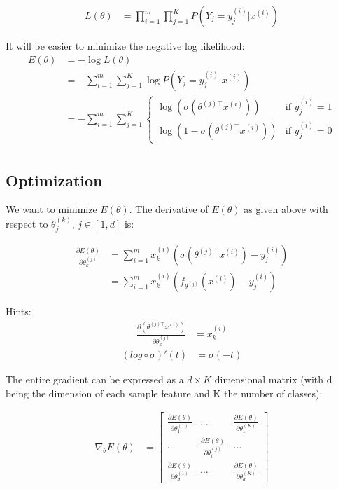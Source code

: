 \begin{align}
	L(\theta) &= \prod_{i=1}^m \prod_{j=1}^K P(Y_j=y_j^{(i)} | x^{(i)}) 
\end{align}


It will be easier to minimize the negative log likelihood:
\begin{align}
	E(\theta) &=  - \log L(\theta) \\
			  &= - \sum_{i=1}^m \sum_{j=1}^K \log  P(Y_j=y_j^{(i)} | x^{(i)}) \\
  			  &= -  \sum_{i=1}^m \sum_{j=1}^K
  			  	\left\{
				    \begin{array}{ll}
				        \log (\sigma(\theta^{(j)\top} x^{(i)})) & \mbox{if } y_j^{(i)} =1 \\
				        \log (1 - \sigma(\theta^{(j)\top} x^{(i)})) & \mbox{if } y_j^{(i)} =0 
				    \end{array}
				\right. \\
\end{align}


\subsection*{Optimization}

We want to minimize $E(\theta)$. The derivative of $E(\theta)$ as given above with respect to $\theta_j^{(k)}$, $j \in [1,d]$ is:

\begin{align}
	\frac{\partial E(\theta)}{\partial \theta_k^{(j)}} 
	&= \sum_{i=1}^m x^{(i)}_k (\sigma(\theta^{(j)\top} x^{(i)}) - y_j^{(i)}) \\
	&= \sum_{i=1}^m x^{(i)}_k (f_{\theta^{(j)}}(x^{(i)})  - y_j^{(i)}) 
\end{align}

Hints:
\begin{align}
	\frac{\partial (\theta^{(j)\top} x^{(i)}) }{\partial \theta_k^{(j)}}  &= x_k^{(i)} 
\end{align}
\begin{align}
	(log \circ \sigma)'(t) &= \sigma(-t)
\end{align}


The entire gradient can be expressed as a $d \times K$ dimensional matrix (with d being the dimension of each sample feature and K the number of classes):

\begin{align}
	\nabla_\theta E(\theta) 
	&= 
	\begin{bmatrix}
		\frac{\partial E(\theta)}{\partial \theta_1^{(1)}} 	& \dots 						& \frac{\partial E(\theta)}{\partial \theta_1^{(K)}} \\
		\dots 												&  \frac{\partial E(\theta)}{\partial \theta_i^{(j)}} 	& \dots \\
		\frac{\partial E(\theta)}{\partial \theta_d^{(1)}} 	& \dots 						& \frac{\partial E(\theta)}{\partial \theta_d^{(K)}}
	\end{bmatrix} 
\end{align}

